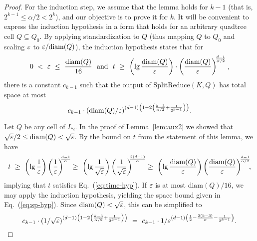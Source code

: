 \documentclass[11pt]{article}   \usepackage[letterpaper,hmargin=2.1cm,vmargin=3cm]{geometry}
\newcommand{\inv}[1]{\frac{1}{#1}}
\newcommand{\alg}{\textrm{SplitReduce}}
\newcommand{\diam}{\mathrm{diam}}
\begin{document}
\begin{proof}
For the induction step, we assume that the lemma holds for $k-1$ (that is, $2^{k-1} \leq \alpha/2 < 2^{k}$), and our objective is to prove it for $k$. It will be convenient to express the induction hypothesis in a form that holds for an arbitrary quadtree cell $Q \subseteq Q_0$. By applying standardization to $Q$ (thus mapping $Q$ to $Q_0$ and scaling $\varepsilon$ to $\eps/\diam(Q)$), the induction hypothesis states that for
\begin{equation} \label{eq:time-hyp}
  0 ~ < ~ \eps ~ \le ~ \frac{\diam(Q)}{16} ~~\hbox{and}~~
	t ~ \ge ~  \left(\lg \frac{\diam(Q)}{\eps} \right) \cdot \left( \frac{\diam(Q)}{\eps} \right)^{\N \frac{d-1}{\alpha/2}},
\end{equation}
there is a constant $c_{k-1}$ such that the output of $\alg(K,Q)$ has total space at most
\begin{equation} \label{eq:sp-hyp}
	c_{k-1} \cdot (\diam(Q)/\eps)^{(d-1) \left(1 - 2 \left(\frac{k - 3}{\alpha/2} + \inv{2^{k-1}}\right) \right)}.
\end{equation}

Let $Q$ be any cell of $L_2$. In the proof of Lemma~\ref{lem:aux2} we showed that $\sqrt{\eps}/2 \le \diam(Q) < \sqrt{\eps}$. By the bound on $t$ from the statement of this lemma, we have
\[
	t
		~ \ge ~ \left( \lg \inv{\eps} \right) \left( \inv{\eps} \right)^{\NN \frac{d-1}{\alpha}} \NN
		~ \ge ~ \left( \lg \inv{\sqrt{\eps}} \right) \left( \inv{\sqrt{\eps}} \right)^{\NN \frac{2(d-1)}{\alpha}} \NN
		~ \ge ~ \left( \lg \frac{\diam(Q)}{\eps} \right) \left( \frac{\diam(Q)}{\eps} \right)^{\N \frac{d-1}{\alpha/2}} \NN ,
\]
implying that $t$ satisfies Eq.~(\ref{eq:time-hyp}). If $\varepsilon$ is at most $\diam(Q)/16$, we may apply the induction hypothesis, yielding the space bound given in Eq.~(\ref{eq:sp-hyp}). Since $\diam(Q) < \sqrt{\eps}$, this can be simplified to
\begin{equation} \label{eq:sp-bound}
	c_{k-1} \cdot (1/\sqrt{\eps})^{(d-1) \left(1 - 2 \left(\frac{k - 3}{\alpha/2} + \inv{2^{k-1}}\right) \right)}
		~ = ~
	c_{k-1} \cdot 1/\eps^{(d-1) \left(\inv{2} - \frac{2(k - 3)}{\alpha} - \inv{2^{k-1}}\right)}.
\end{equation}


\end{proof}
\end{document}
